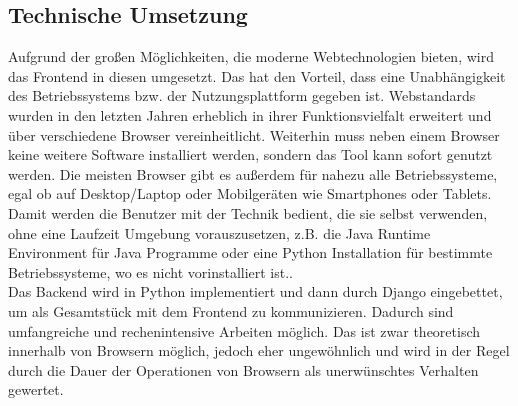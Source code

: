 \subsection{Technische Umsetzung}
Aufgrund der großen Möglichkeiten, die moderne Webtechnologien bieten, wird das
Frontend in diesen umgesetzt. Das hat den Vorteil, dass eine Unabhängigkeit des
Betriebssystems bzw. der Nutzungsplattform gegeben ist. Webstandards wurden in
den letzten Jahren erheblich in ihrer Funktionsvielfalt erweitert und über
verschiedene Browser vereinheitlicht. Weiterhin muss neben einem Browser keine
weitere Software installiert werden, sondern das Tool kann sofort genutzt
werden. Die meisten Browser gibt es außerdem für nahezu alle Betriebssysteme,
egal ob auf Desktop/Laptop oder Mobilgeräten wie Smartphones oder Tablets. Damit
werden die Benutzer mit der Technik bedient, die sie selbst verwenden, ohne
eine Laufzeit Umgebung vorauszusetzen, z.B. die Java Runtime Environment für
Java Programme oder eine Python Installation für bestimmte
Betriebssysteme, wo es nicht vorinstalliert ist..\\
Das Backend wird in Python implementiert und dann durch Django eingebettet, um
als Gesamtstück mit dem Frontend zu kommunizieren. Dadurch sind umfangreiche und
rechenintensive Arbeiten möglich. Das ist zwar theoretisch innerhalb von
Browsern möglich, jedoch eher ungewöhnlich und wird in der Regel durch die Dauer
der Operationen von Browsern als unerwünschtes Verhalten gewertet.